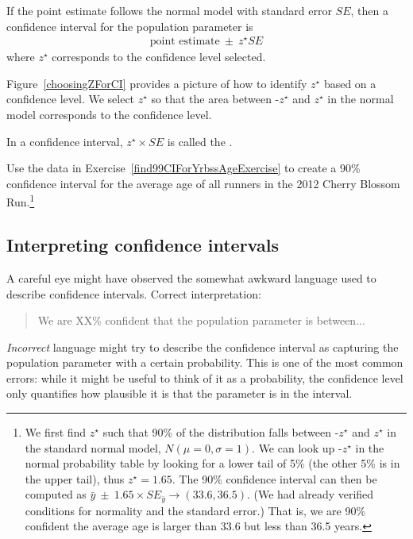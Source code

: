 \begin{termBox}{
If the point estimate follows the normal model with standard error $SE$, then a confidence interval for the population parameter is
\begin{eqnarray*}
\text{point estimate}\ \pm\ z^{\star} SE
\end{eqnarray*}
where $z^{\star}$ corresponds to the confidence level selected.}
\end{termBox}

Figure~\ref{choosingZForCI} provides a picture of how to identify $z^{\star}$ based on a confidence level. We select $z^{\star}$ so that the area between -$z^{\star}$ and $z^{\star}$ in the normal model corresponds to the confidence level. 

\begin{termBox}{
\label{marginOfErrorTermBox}In a confidence interval, $z^{\star}\times SE$ is called the .}
\end{termBox}

\begin{exercise} \label{find90CIForYrbssAgeExercise}
Use the data in Exercise~\ref{find99CIForYrbssAgeExercise} to create a 90\% confidence interval for the average age of all runners in the 2012 Cherry Blossom Run.\footnote{We first find $z^{\star}$ such that 90\% of the distribution falls between -$z^{\star}$ and $z^{\star}$ in the standard normal model, $N(\mu=0, \sigma=1)$. We can look up -$z^{\star}$ in the normal probability table by looking for a lower tail of 5\% (the other 5\% is in the upper tail), thus $z^{\star}=1.65$. The 90\% confidence interval can then be computed as $\bar{y}\ \pm\ 1.65\times SE_{\bar{y}} \to (33.6, 36.5)$. (We had already verified conditions for normality and the standard error.) That is, we are 90\% confident the average age is larger than 33.6 but less than 36.5 years.}
\end{exercise}

\subsection{Interpreting confidence intervals}
\label{interpretingCIs}


A careful eye might have observed the somewhat awkward language used to describe confidence intervals. Correct interpretation:
\begin{quote}
We are XX\% confident that the population parameter is between...
\end{quote}
\emph{Incorrect} language might try to describe the confidence interval as capturing the population parameter with a certain probability. This is one of the most common errors: while it might be useful to think of it as a probability, the confidence level only quantifies how plausible it is that the parameter is in the interval.

